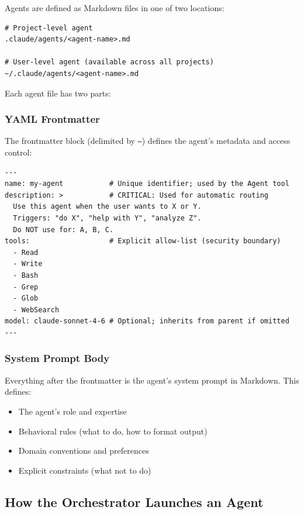 \documentclass[11pt,letterpaper]{article}
\begin{document}
Agents are defined as Markdown files in one of two locations:

\begin{lstlisting}[style=BashStyle, caption={Agent file locations}]
# Project-level agent
.claude/agents/<agent-name>.md

# User-level agent (available across all projects)
~/.claude/agents/<agent-name>.md
\end{lstlisting}

Each agent file has two parts:

\subsubsection{YAML Frontmatter}

The frontmatter block (delimited by \texttt{---}) defines the agent's metadata and access control:

\begin{lstlisting}[style=MarkdownStyle, caption={Agent frontmatter fields}]
---
name: my-agent           # Unique identifier; used by the Agent tool
description: >           # CRITICAL: Used for automatic routing
  Use this agent when the user wants to X or Y.
  Triggers: "do X", "help with Y", "analyze Z".
  Do NOT use for: A, B, C.
tools:                   # Explicit allow-list (security boundary)
  - Read
  - Write
  - Bash
  - Grep
  - Glob
  - WebSearch
model: claude-sonnet-4-6 # Optional; inherits from parent if omitted
---
\end{lstlisting}

\subsubsection{System Prompt Body}

Everything after the frontmatter is the agent's system prompt in Markdown. This defines:
\begin{itemize}[leftmargin=*]
    \item The agent's role and expertise
    \item Behavioral rules (what to do, how to format output)
    \item Domain conventions and preferences
    \item Explicit constraints (what not to do)
\end{itemize}

\subsection{How the Orchestrator Launches an Agent}
\end{document}
